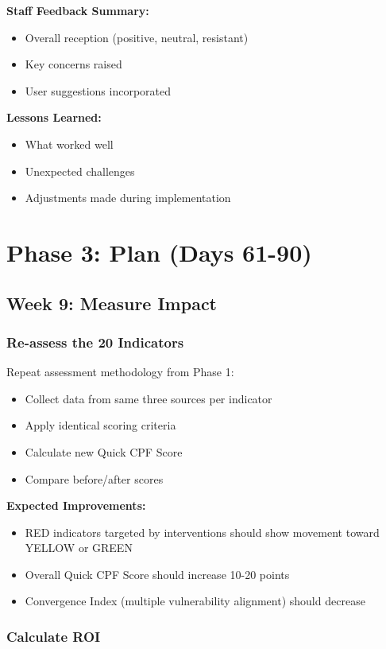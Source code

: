 \documentclass[11pt,a4paper]{article}
\begin{document}
\textbf{Staff Feedback Summary:}
\begin{itemize}
\item Overall reception (positive, neutral, resistant)
\item Key concerns raised
\item User suggestions incorporated
\end{itemize}

\textbf{Lessons Learned:}
\begin{itemize}
\item What worked well
\item Unexpected challenges
\item Adjustments made during implementation
\end{itemize}

\section{Phase 3: Plan (Days 61-90)}

\subsection{Week 9: Measure Impact}

\subsubsection{Re-assess the 20 Indicators}

Repeat assessment methodology from Phase 1:
\begin{itemize}
\item Collect data from same three sources per indicator
\item Apply identical scoring criteria
\item Calculate new Quick CPF Score
\item Compare before/after scores
\end{itemize}

\textbf{Expected Improvements:}
\begin{itemize}
\item RED indicators targeted by interventions should show movement toward YELLOW or GREEN
\item Overall Quick CPF Score should increase 10-20 points
\item Convergence Index (multiple vulnerability alignment) should decrease
\end{itemize}

\subsubsection{Calculate ROI}
\end{document}
